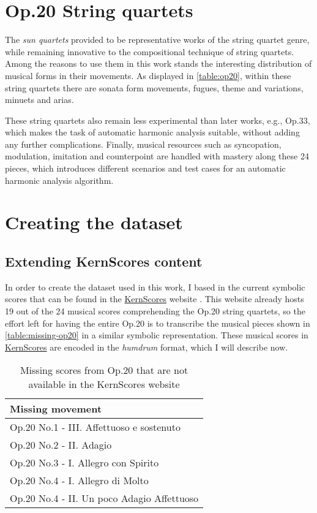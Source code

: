 \section{Op.20 String quartets}
The \emph{sun quartets} provided to be representative works of the string quartet genre, while remaining innovative to the compositional technique of string quartets. Among the reasons to use them in this work stands the interesting distribution of musical forms in their movements. As displayed in \autoref{table:op20}, within these string quartets there are sonata form movements, fugues, theme and variations, minuets and arias.

These string quartets also remain less experimental than later works, e.g., Op.33, which makes the task of automatic harmonic analysis suitable, without adding any further complications. Finally, musical resources such as syncopation, modulation, imitation and counterpoint are handled with mastery along these 24 pieces, which introduces different scenarios and test cases for an automatic harmonic analysis algorithm.

\section{Creating the dataset}
\subsection{Extending KernScores content}
In order to create the dataset used in this work, I based in the current symbolic scores that can be found in the \href{http://kern.ccarh.org/}{KernScores} website \cite{kernscores}. This website already hosts 19 out of the 24 musical scores comprehending the Op.20 string quartets, so the effort left for having the entire Op.20 is to transcribe the musical pieces shown in \autoref{table:missing-op20} in a similar symbolic representation. These musical scores in \href{http://kern.ccarh.org/}{KernScores} are encoded in the \emph{humdrum} format, which I will describe now.

\begin{table}[tbp]
\centering
\begin{tabular}{|l|}
\hline
Missing movement \\ \hline
Op.20 No.1 - III. Affettuoso e sostenuto \\ \hline
Op.20 No.2 - II. Adagio \\ \hline
Op.20 No.3 - I. Allegro con Spirito \\ \hline
Op.20 No.4 - I. Allegro di Molto \\ \hline
Op.20 No.4 - II. Un poco Adagio Affettuoso \\ \hline
\end{tabular}
\caption{Missing scores from Op.20 that are not available in the KernScores website}
\label{table:missing-op20}
\end{table}

